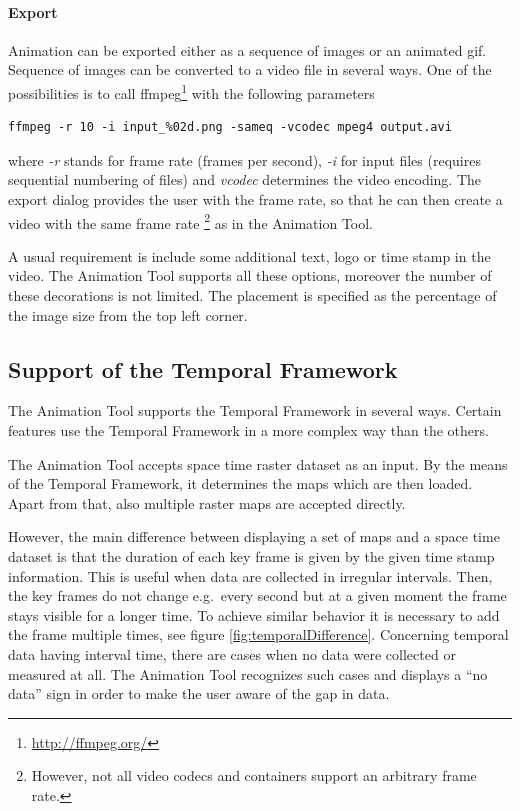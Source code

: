 \documentclass[a4paper,12pt]{book}
\newcommand{\tf}{Temporal Framework\xspace}
\newcommand{\at}{Animation Tool\xspace}
\begin{document}
        
      
\paragraph{Export}
Animation can be exported either as a sequence of images or an animated gif.
Sequence of images can be converted to a video file in several ways.
One of the possibilities is to call ffmpeg\footnote{\url{http://ffmpeg.org/}} with the following parameters
      
\begin{footnotesize}
\begin{lstlisting}[style=mybash]
ffmpeg -r 10 -i input_%02d.png -sameq -vcodec mpeg4 output.avi
\end{lstlisting}
\end{footnotesize}
      where \emph{-r} stands for frame rate (frames per second),
      \emph{-i} for input files (requires sequential numbering of files) and
      \emph{vcodec} determines the video encoding.
      The export dialog provides the user with the frame rate, so that he can then create
      a video with the same frame rate%
      \footnote{However, not all video codecs and containers support an arbitrary frame rate.} as in the \at.

      A usual requirement is include some additional text, logo or time stamp in the video.
      The \at supports all these options, moreover the number of these decorations is not limited.
      The placement is specified as the percentage of the image size from the top left corner.
      

\subsection{Support of the \tf}
\label{sec:wx.animation:support}
The \at supports the \tf in several ways. Certain features use the \tf in a more complex way than the others.

The \at accepts space time raster dataset as an input. By the means of the \tf, it determines the maps which are then loaded.
Apart from that, also multiple raster maps are accepted directly.

However, the main difference between displaying a set of maps and a space time dataset is
that the duration of each key frame is given by the given time stamp information.
This is useful when data are collected in irregular intervals.
Then, the key frames do not change e.g.\ every second but at a given moment the frame stays visible for a longer time.
To achieve similar behavior it is necessary to add the frame multiple times, see figure \ref{fig:temporalDifference}.
Concerning temporal data having interval time, there are cases when no data were collected or measured at all.
The \at recognizes such cases and displays a ``no data'' sign in order to make the user aware of the gap in data.
\end{document}
